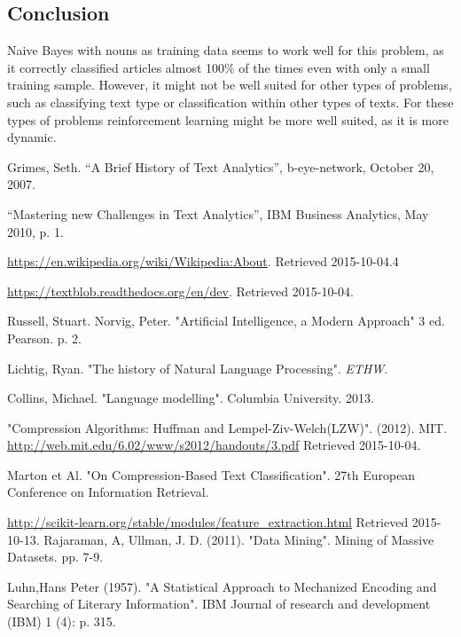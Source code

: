 \documentclass[a4paper]{article}
\begin{document}
\subsection{Conclusion}

Naive Bayes with nouns as training data seems to work well for this problem, as it correctly classified articles almost 100\% of the times even with only a small training sample. However, it might not be well suited for other types of problems, such as classifying text type or classification within other types of texts\cite{NBpoems}. For these types of problems reinforcement learning might be more well suited, as it is more dynamic.
 
\begin{thebibliography}{9}

Grimes, Seth. “A Brief History of Text Analytics”, b-eye-network, October 20, 2007.

“Mastering new Challenges in Text Analytics”, IBM Business Analytics, May 2010, p. 1.

\url{https://en.wikipedia.org/wiki/Wikipedia:About}. Retrieved 2015-10-04.4

\url{https://textblob.readthedocs.org/en/dev}. Retrieved 2015-10-04.

Russell, Stuart. Norvig, Peter. "Artificial Intelligence, a Modern Approach" 3 ed. Pearson. p. 2.

Lichtig, Ryan. "The history of Natural Language Processing". \textit{ETHW}. 

Collins, Michael. "Language modelling". Columbia University. 2013.


"Compression Algorithms: Huffman and Lempel-Ziv-Welch(LZW)". (2012). MIT.
\url{http://web.mit.edu/6.02/www/s2012/handouts/3.pdf} Retrieved 2015-10-04.

Marton et Al. "On Compression-Based Text Classification". 27th European Conference on Information Retrieval.


\url{http://scikit-learn.org/stable/modules/feature_extraction.html}
Retrieved 2015-10-13.
Rajaraman, A, Ullman, J. D. (2011). "Data Mining". Mining of Massive Datasets. pp. 7-9.

Luhn,Hans Peter (1957). "A Statistical Approach to Mechanized Encoding and Searching of Literary Information". IBM Journal of research and development (IBM) 1 (4): p. 315.



\end{thebibliography}
\end{document}
